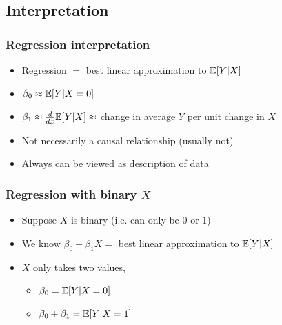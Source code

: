 \subsection{Interpretation}
\begin{frame} \frametitle{Regression interpretation}
  \begin{itemize}
  \item Regression $=$ best linear approximation to $\mathbb{E}[Y|X]$
  \item $\beta_0 \approx \mathbb{E}[Y|X=0]$
  \item $\beta_1 \approx \frac{d}{dx} \mathbb{E}[Y|X] \approx$ change in average
    $Y$ per unit change in $X$
  \item Not necessarily a causal relationship (usually not)
  \item Always can be viewed as description of data
  \end{itemize}
\end{frame}

\begin{frame}\frametitle{Regression with binary $X$}
  
      \begin{itemize}
      \item Suppose $X$ is binary (i.e. can only be $0$ or $1$)
      \item We know $\beta_0 + \beta_1 X = $ best linear approximation to
        $\mathbb{E}[Y|X]$ 
      \item $X$ only takes two values,

        \begin{itemize}
        \item $\beta_0 = \mathbb{E}[Y|X=0]$
        \item $\beta_0 + \beta_1 = \mathbb{E}[Y|X=1]$
        \end{itemize}

      \end{itemize}
    
\end{frame}

